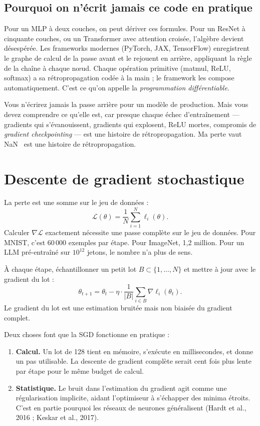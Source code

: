 \subsection{Pourquoi on n'écrit jamais ce code en pratique}

Pour un MLP à deux couches, on peut dériver ces formules. Pour un ResNet à cinquante couches, ou un Transformer avec attention croisée, l'algèbre devient désespérée. Les frameworks modernes (PyTorch, JAX, TensorFlow) enregistrent le graphe de calcul de la passe avant et le rejouent en arrière, appliquant la règle de la chaîne à chaque nœud. Chaque opération primitive (matmul, ReLU, softmax) a sa rétropropagation codée à la main ; le framework les compose automatiquement. C'est ce qu'on appelle la \emph{programmation différentiable}.

\begin{aitip}
Vous n'écrirez jamais la passe arrière pour un modèle de production. Mais vous devez comprendre ce qu'elle est, car presque chaque échec d'entraînement --- gradients qui s'évanouissent, gradients qui explosent, ReLU mortes, compromis de \emph{gradient checkpointing} --- est une histoire de rétropropagation. \og Ma perte vaut NaN \fg\ est une histoire de rétropropagation.
\end{aitip}

\section{Descente de gradient stochastique}

La perte est une somme sur le jeu de données :
\[
\mathcal{L}(\theta) = \frac{1}{N} \sum_{i=1}^N \ell_i(\theta).
\]
Calculer $\nabla \mathcal{L}$ exactement nécessite une passe complète sur le jeu de données. Pour MNIST, c'est 60\,000 exemples par étape. Pour ImageNet, 1,2 million. Pour un LLM pré-entraîné sur $10^{12}$ jetons, le nombre n'a plus de sens.

\begin{definition}
À chaque étape, échantillonner un petit lot $B \subset \{1, \ldots, N\}$ et mettre à jour avec le gradient du lot :
\[
\theta_{t+1} = \theta_t - \eta \cdot \frac{1}{|B|} \sum_{i \in B} \nabla \ell_i(\theta_t).
\]
Le gradient du lot est une estimation bruitée mais non biaisée du gradient complet.
\end{definition}

Deux choses font que la SGD fonctionne en pratique :

\begin{enumerate}
  \item \textbf{Calcul.} Un lot de 128 tient en mémoire, s'exécute en millisecondes, et donne un pas utilisable. La descente de gradient complète serait cent fois plus lente par étape pour le même budget de calcul.
  \item \textbf{Statistique.} Le bruit dans l'estimation du gradient agit comme une régularisation implicite, aidant l'optimiseur à s'échapper des minima étroits. C'est en partie pourquoi les réseaux de neurones généralisent (Hardt et al., 2016 ; Keskar et al., 2017).
\end{enumerate}

